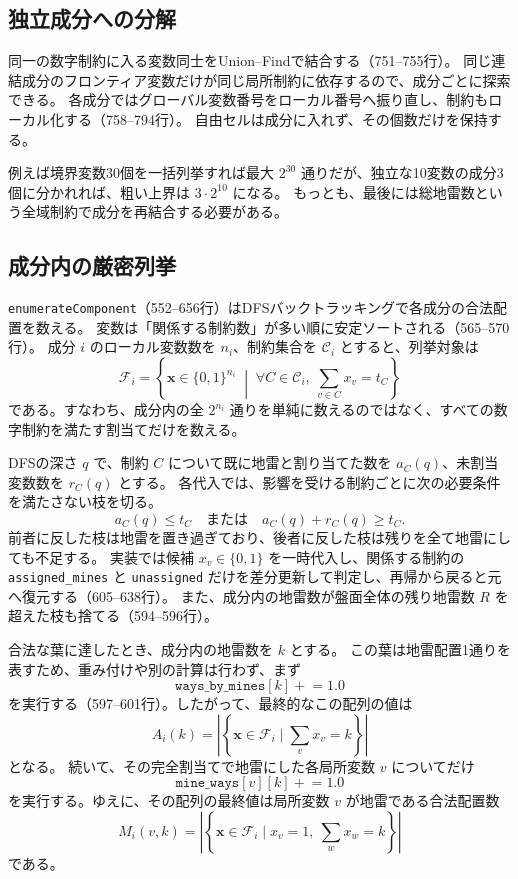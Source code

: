 \documentclass[uplatex,dvipdfmx,11pt]{jsarticle}
\newcommand{\code}[1]{\texttt{#1}}
\begin{document}
\subsection{独立成分への分解}
同一の数字制約に入る変数同士をUnion--Findで結合する（751--755行）。
同じ連結成分のフロンティア変数だけが同じ局所制約に依存するので、成分ごとに探索できる。
各成分ではグローバル変数番号をローカル番号へ振り直し、制約もローカル化する（758--794行）。
自由セルは成分に入れず、その個数だけを保持する。

例えば境界変数30個を一括列挙すれば最大 $2^{30}$ 通りだが、独立な10変数の成分3個に分かれれば、粗い上界は $3\cdot2^{10}$ になる。
もっとも、最後には総地雷数という全域制約で成分を再結合する必要がある。

\subsection{成分内の厳密列挙}
\code{enumerateComponent}（552--656行）はDFSバックトラッキングで各成分の合法配置を数える。
変数は「関係する制約数」が多い順に安定ソートされる（565--570行）。
成分 $i$ のローカル変数数を $n_i$、制約集合を $\mathcal{C}_i$ とすると、列挙対象は
\[
  \mathcal{F}_i
  =
  \left\{
    \boldsymbol{x}\in\{0,1\}^{n_i}
    \;\middle|\;
    \forall C\in\mathcal{C}_i,\ 
    \sum_{v\in C}x_v=t_C
  \right\}
\]
である。すなわち、成分内の全 $2^{n_i}$ 通りを単純に数えるのではなく、すべての数字制約を満たす割当てだけを数える。

DFSの深さ $q$ で、制約 $C$ について既に地雷と割り当てた数を $a_C(q)$、未割当変数数を $r_C(q)$ とする。
各代入では、影響を受ける制約ごとに次の必要条件を満たさない枝を切る。
\[
  a_C(q)\le t_C
  \quad\text{または}\quad
  a_C(q)+r_C(q)\ge t_C.
\]
前者に反した枝は地雷を置き過ぎており、後者に反した枝は残りを全て地雷にしても不足する。
実装では候補 $x_v\in\{0,1\}$ を一時代入し、関係する制約の \code{assigned\_mines} と \code{unassigned} だけを差分更新して判定し、再帰から戻ると元へ復元する（605--638行）。
また、成分内の地雷数が盤面全体の残り地雷数 $R$ を超えた枝も捨てる（594--596行）。

合法な葉に達したとき、成分内の地雷数を $k$ とする。
この葉は地雷配置1通りを表すため、重み付けや別の計算は行わず、まず
\[
  \code{ways\_by\_mines}[k]\mathrel{+}=1.0
\]
を実行する（597--601行）。したがって、最終的なこの配列の値は
\[
  A_i(k)
  =
  \left|\left\{
    \boldsymbol{x}\in\mathcal{F}_i
    \mid \sum_vx_v=k
  \right\}\right|
\]
となる。
続いて、その完全割当てで地雷にした各局所変数 $v$ についてだけ
\[
  \code{mine\_ways}[v][k]\mathrel{+}=1.0
\]
を実行する。ゆえに、その配列の最終値は局所変数 $v$ が地雷である合法配置数
\[
  M_i(v,k)
  =
  \left|\left\{
    \boldsymbol{x}\in\mathcal{F}_i
    \mid x_v=1,\ \sum_wx_w=k
  \right\}\right|
\]
である。
\end{document}
